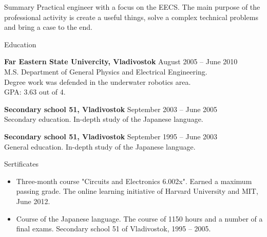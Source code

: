 \documentclass{template}
\begin{document}

\begin{rSection}{Summary}
Practical engineer with a focus on the EECS. The main purpose of the professional activity is create a useful things, solve a complex technical problems and bring a case to the end.
\end{rSection}


\begin{rSection}{Education}

{\bf Far Eastern State Univercity, Vladivostok} \hfill {August 2005 -- June 2010} \\ 
M.S. Department of General Physics and Electrical Engineering. \\
Degree work was defended in the underwater robotics area. \\
GPA: 3.63 out of 4.

{\bf Secondary school 51, Vladivostok} \hfill {September 2003 -- June 2005} \\
Secondary education. In-depth study of the Japanese language.

{\bf Secondary school 51, Vladivostok} \hfill {September 1995 -- June 2003} \\
General education. In-depth study of the Japanese language.

\end{rSection}


\begin{rSection}{Sertificates}

\begin{itemize}
\item Three-month course "Circuits and Electronics 6.002x". Earned a maximum passing grade. The online learning initiative of Harvard University and MIT, June 2012.
\item Course of the Japanese language. The course of 1150 hours and a number of a final exams. Secondary school 51 of Vladivostok, 1995 -- 2005.
\end{itemize}

\end{rSection}
\end{document}
